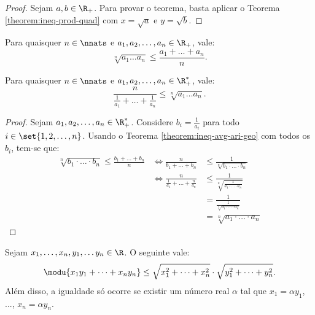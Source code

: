 \begin{proof}
Sejam $a, b \in \R_+$. Para provar o teorema, basta aplicar o Teorema \ref{theorem:ineq-prod-quad} com $x = \sqrt a$ e $y = \sqrt b$.
\end{proof}

\begin{theorem}
\label{theorem:ineq-avg-ari-geo}
Para quaisquer $n \in \nnats$ e $a_1, a_2, \dots , a_n \in \R_+$, vale:
%
\begin{equation*}
    \sqrt[n]{a_1\dots a_n} \leq \frac {a_1 + \dots + a_n} n.
\end{equation*}
\end{theorem}

\begin{tve}
\end{tve}

\begin{theorem}
Para quaisquer $n \in \nnats$ e $a_1, a_2, \dots , a_n \in \R_+^*$, vale:
%
\begin{equation*}
    \frac n {\frac 1 {a_1} + \dots + \frac 1 {a_n}}  \leq \sqrt[n]{a_1\dots a_n}  .
\end{equation*}
\end{theorem}

\begin{proof}
Sejam $a_1, a_2, \dots, a_n \in \R_+ ^*$. Considere $b_i = \frac 1 {a_i}$ para todo $i \in \set{1, 2, \dots, n}$. Usando o Teorema \ref{theorem:ineq-avg-ari-geo} com todos os $b_i$, tem-se que:
%
\begin{eqnarray*}
\sqrt[n]{b_1 \cdot \dots \cdot b_n } \le \frac {b_1 + \dots + b_n } n & \iff \frac n {b_1 + \dots + b_n } & \le \frac 1 {\sqrt[n]{b_1 \cdot \dots \cdot b_n }} \\
& \iff \frac n {\frac 1 {a_1} + \dots + \frac n {a_n}} & \le \frac 1 {\sqrt[n]{\frac 1 {a_1 \cdot \dots \cdot a_n}}} \\ 
& & = \frac 1 {\frac 1 {\sqrt[n]{a_1 \cdot \dots \cdot a_n}}} \\ 
& & =  \sqrt[n]{a_1 \cdot \dots \cdot a_n}
\end{eqnarray*}
\end{proof}

\begin{theorem}
Sejam $x_1, \dots , x_n, y_1, \dots y_n \in \R$. O seguinte vale:
%
\begin{equation*}
    \modu{x_1y_1 + \dots + x_ny_n} \leq \sqrt{x^2_1+ \dots + x^2_n}
    \cdot \sqrt{y^2_1+ \dots + y^2_n}.
\end{equation*}
%
Além disso, a igualdade só ocorre se existir um número real $\alpha$ tal que $x_1 = \alpha y_1$, ..., $x_n = \alpha y_n$.
\end{theorem}

